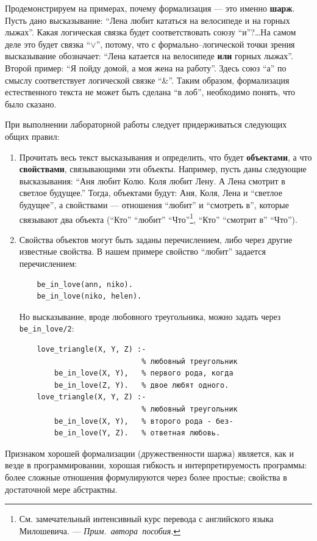 \documentclass[12pt, openany, twoside]{book} %
\def\AR{{\em Прим.~автора~пособия}}
\begin{document}
Продемонстрируем на примерах, почему формализация --- это именно {\bf шарж}. Пусть дано высказывание: ``Лена любит кататься на велосипеде и на горных лыжах''. Какая логическая связка будет соответствовать союзу ``и''?\ldots На самом деле это будет связка ``$\vee$'', потому, что с формально--логической точки зрения высказывание обозначает: ``Лена катается на велосипеде {\bf или} горных лыжах''. Второй пример: ``Я пойду домой, а моя жена на работу''. Здесь союз ``а'' по смыслу соответствует логической связке ``\&''. Таким образом, формализация естественного текста не может быть сделана ``в лоб'', необходимо понять, что было сказано.

При выполнении лабораторной работы следует придерживаться следующих общих правил:
\begin{enumerate}
\item Прочитать весь текст высказывания и определить, что будет {\bf объектами}, а что {\bf свойствами}, связывающими эти объекты. Например, пусть даны следующие высказывания: ``Аня любит Колю. Коля любит Лену. А Лена смотрит в светлое будущее.'' Тогда, объектами будут: Аня, Коля, Лена и ``светлое будущее'', а свойствами --- отношения ``любит'' и ``смотреть в'', которые связывают два объекта (``Кто'' ``любит''
``Что''\footnote{См. замечательный интенсивный курс перевода с английского языка Милошевича. --- \AR.}, ``Кто'' ``смотрит в'' ``Что'').
\item Свойства объектов могут быть заданы перечислением, либо через другие известные свойства. В нашем примере свойство ``любит'' задается перечислением:
{\tt\begin{verbatim}
    be_in_love(ann, niko).
    be_in_love(niko, helen).
\end{verbatim}}
\noindent Но высказывание, вроде любовного треугольника, можно задать через {\tt be\_in\_love/2}:
{\tt\begin{verbatim}
    love_triangle(X, Y, Z) :-
                            % любовный треугольник
        be_in_love(X, Y),   % первого рода, когда
        be_in_love(Z, Y).   % двое любят одного.
    love_triangle(X, Y, Z) :-
                            % любовный треугольник
        be_in_love(X, Y),   % второго рода - без-
        be_in_love(Y, Z).   % ответная любовь.
\end{verbatim}}
\end{enumerate}

Признаком хорошей формализации (дружественности шаржа) является, как и везде в программировании, хорошая гибкость и интерпретируемость программы: более сложные отношения формулируются через более простые; свойства в достаточной мере абстрактны.
\end{document}
